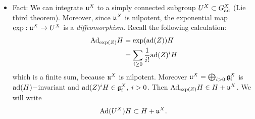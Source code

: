 \begin{itemize}
    \item Fact: We can integrate $\mathfrak{u}^X$ to a simply connected subgroup $U^X\subset G_{\text{ad}}^X$ (Lie third theorem). 
    Moreover, since $\mathfrak{u}^X$ is nilpotent, the exponential map $\exp:\mathfrak{u}^X\to U^X$ is a \textit{diffeomorphism}. 
    Recall the following calculation:
    \begin{equation}
        \begin{split}
             \text{Ad}_{\exp(Z)}H&=\exp(\text{ad}(Z))H\\
              &=\sum_{i\geq0}\frac{1}{i!}\text{ad}(Z)^iH
        \end{split}
    \end{equation} 
    which is a finite sum, because $\mathfrak{u}^X$ is nilpotent. Moreover $\mathfrak{u}^X=\bigoplus_{i>0}\mathfrak{g}_i^X$ is 
    $\text{ad}(H)-$invariant and $\text{ad}(Z)^iH\in\mathfrak{g}_i^X,\;i>0$. Then $\text{Ad}_{\exp(Z)}H\in H+\mathfrak{u}^X$. We will write 
    \begin{equation}
        \text{Ad}(U^X)H\subset H+\mathfrak{u}^X.
    \end{equation}


\end{itemize}
